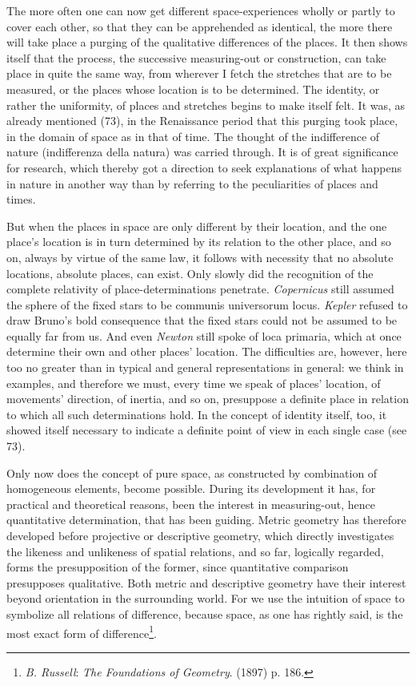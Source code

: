 \documentclass[12pt,a4paper]{book}
\newcommand{\opage}[1]{\marginnote{\footnotesize\textit{[#1]}}}
\begin{document}
The more often one can now get different space-experiences wholly or partly
to cover each other, so that they can be apprehended as identical, the more
there will take place a purging of the qualitative differences of the places.
It then shows itself that the process, the successive measuring-out or
construction, can take place in quite the same way, from wherever I fetch the
stretches that are to be measured, or the places whose location is to be
determined. The identity, or rather the uniformity, of places and stretches
begins to make itself felt. It was, as already mentioned (73), in the
Renaissance period that this purging took place, in the domain of space \opage{199}as in
that of time. The thought of the indifference of nature (indifferenza della
natura) was carried through. It is of great significance for research, which
thereby got a direction to seek explanations of what happens in nature in
another way than by referring to the peculiarities of places and times.

But when the places in space are only different by their location, and the
one place's location is in turn determined by its relation to the other
place, and so on, always by virtue of the same law, it follows with necessity
that no absolute locations, absolute places, can exist. Only slowly did the
recognition of the complete relativity of place-determinations penetrate.
\emph{Copernicus} still assumed the sphere of the fixed stars to be communis
universorum locus. \emph{Kepler} refused to draw Bruno's bold consequence
that the fixed stars could not be assumed to be equally far from us. And even
\emph{Newton} still spoke of loca primaria, which at once determine their own
and other places' location. The difficulties are, however, here too no
greater than in typical and general representations in general: we think in
examples, and therefore we must, every time we speak of places' location, of
movements' direction, of inertia, and so on, presuppose a definite place in
relation to which all such determinations hold. In the concept of identity
itself, too, it showed itself necessary to indicate a definite point of view
in each single case (see 73).

Only now does the concept of pure space, as constructed by combination of
homogeneous elements, become possible. During its development it has, for
practical and theoretical reasons, been the interest in measuring-out, hence
quantitative determination, that has been guiding. Metric geometry has
therefore developed before projective or descriptive geometry, which directly
investigates the likeness and unlikeness of spatial relations, and so far,
logically regarded, forms the presupposition of the former, since
quantitative comparison presupposes qualitative. Both metric and descriptive
geometry have their interest beyond orientation in the surrounding world. For
we use the intuition of space to symbolize all \opage{200}relations of difference,
because space, as one has rightly said, is the most exact form of
difference\footnote{\emph{B. Russell}: \emph{The Foundations of Geometry}.
(1897) p. 186.}.
\end{document}
